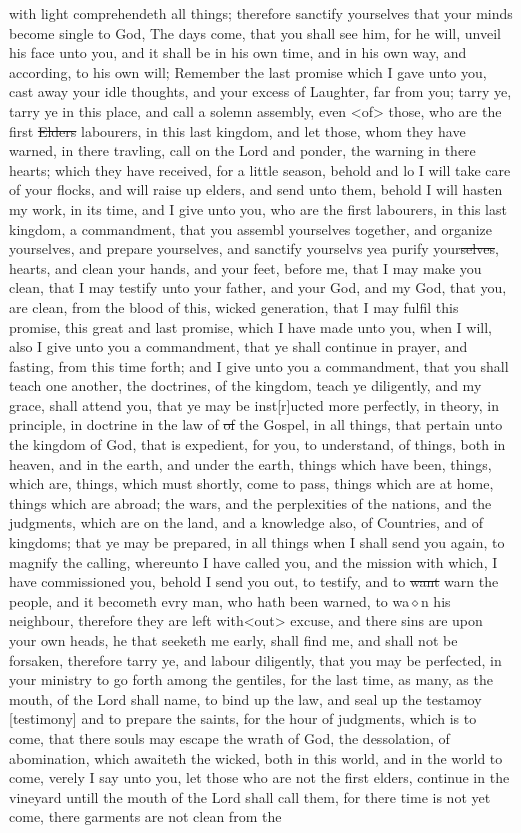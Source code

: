 with light comprehendeth all things; therefore sanctify yourselves that your minds become single to God, The days come, that you shall see him, for he will, unveil his face unto you, and it shall be in his own time, and in his own way, and according, to his own will; Remember the last promise which I gave unto you, cast away your idle thoughts, and your excess of Laughter, far from you; tarry ye, tarry ye in this place, and call a solemn assembly, even <of> those, who are the first \sout{Elders} labourers, in this last kingdom, and let those, whom they have warned, in there travling, call on the Lord and ponder, the warning in there hearts; which they have received, for a little season, behold and lo I will take care of your flocks, and will raise up elders, and send unto them, behold I will hasten my work, in its time, and I give unto you, who are the first labourers, in this last kingdom, a commandment, that you assembl yourselves together, and organize yourselves, and prepare yourselves, and sanctify yourselvs yea purify your\sout{selves}, hearts, and clean your hands, and your feet, before me, that I may make you clean, that I may testify unto your father, and your God, and my God, that you, are clean, from the blood of this, wicked generation, that I may fulfil this promise, this great and last promise, which I have made unto you, when I will, also I give unto you a commandment, that ye shall continue in prayer, and fasting, from this time forth; and I give unto you a commandment, that you shall teach one another, the doctrines, of the kingdom, teach ye diligently, and my grace, shall attend you, that ye may be inst[r]ucted more perfectly, in theory, in principle, in doctrine in the law of \sout{of} the Gospel, in all things, that pertain unto the kingdom of God, that is expedient, for you, to understand, of things, both in heaven, and in the earth, and under the earth, things which have been, things, which are, things, which must shortly, come to pass, things which are at home, things which are abroad; the wars, and the perplexities of the nations, and the judgments, which are on the land, and a knowledge also, of Countries, and of kingdoms; that ye may be prepared, in all things when I shall send you again, to magnify the calling, whereunto I have called you, and the mission with which, I have commissioned you, behold I send you out, to testify, and to \sout{want} warn the people, and it becometh evry man, who hath been warned, to wa$\diamond$n his neighbour, therefore they are left with<out> excuse, and there sins are upon your own heads, he that seeketh me early, shall find me, and shall not be forsaken, therefore tarry ye, and labour diligently, that you may be perfected, in your ministry to go forth among the gentiles, for the last time, as many, as the mouth, of the Lord shall name, to bind up the law, and seal up the testamoy [testimony] and to prepare the saints, for the hour of judgments, which is to come, that there souls may escape the wrath of God, the dessolation, of abomination, which awaiteth the wicked, both in this world, and in the world to come, verely I say unto you, let those who are not the first elders, continue in the vineyard untill the mouth of the Lord shall call them, for there time is not yet come, there garments are not clean from the 
